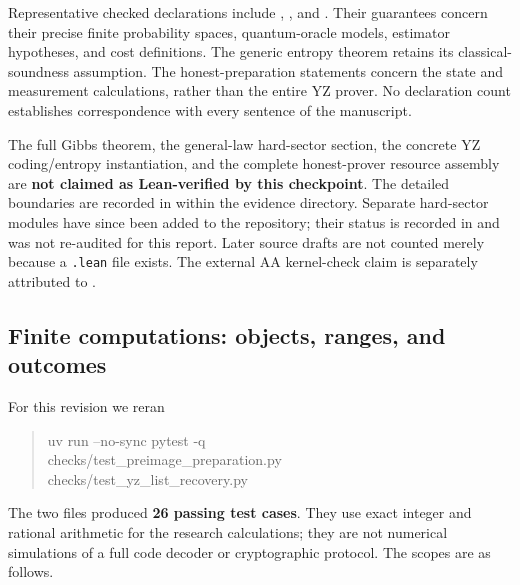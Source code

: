 \documentclass[11pt]{article}
\theoremstyle{definition}\newtheorem{definition}[theorem]{Definition}
\theoremstyle{remark}\newtheorem{remark}[theorem]{Remark}
\begin{document}
Representative checked declarations include
,
, and
.
Their guarantees concern their precise finite probability spaces, quantum-oracle models, estimator hypotheses, and cost definitions. The generic entropy theorem retains its classical-soundness assumption. The honest-preparation statements concern the state and measurement calculations, rather than the entire YZ prover. No declaration count establishes correspondence with every sentence of the manuscript.

The full Gibbs theorem, the general-law hard-sector section, the concrete YZ coding/entropy instantiation, and the complete honest-prover resource assembly are \textbf{not claimed as Lean-verified by this checkpoint}. The detailed boundaries are recorded in  within the evidence directory. Separate hard-sector modules have since been added to the repository; their status is recorded in  and was not re-audited for this report. Later source drafts are not counted merely because a \texttt{.lean} file exists. The external AA kernel-check claim is separately attributed to \cite{Tur26}.

\subsection{Finite computations: objects, ranges, and outcomes}\label{sec:computation}
For this revision we reran
\begin{quote}\small\ttfamily
uv run --no-sync pytest -q\\
checks/test\_preimage\_preparation.py\\
checks/test\_yz\_list\_recovery.py
\end{quote}
The two files produced \textbf{26 passing test cases}. They use exact integer and rational arithmetic for the research calculations; they are not numerical simulations of a full code decoder or cryptographic protocol. The scopes are as follows.
\end{document}

